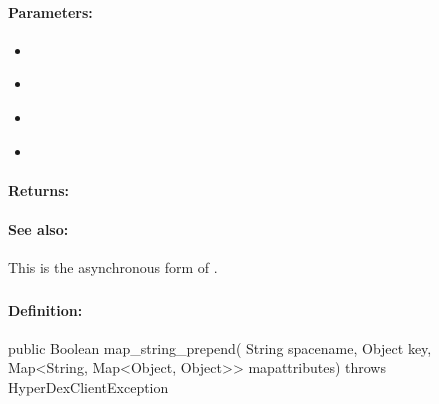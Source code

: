 \paragraph{Parameters:}
\begin{itemize}[noitemsep]
\item {}\\

\item {}\\

\item {}\\

\item {}\\

\end{itemize}

\paragraph{Returns:}


\paragraph{See also:}  This is the asynchronous form of .

\pagebreak
\subsubsection{}
\label{api:java:map_string_prepend}


\paragraph{Definition:}
\begin{javacode}
public Boolean map_string_prepend(
        String spacename,
        Object key,
        Map<String, Map<Object, Object>> mapattributes) throws HyperDexClientException
\end{javacode}

